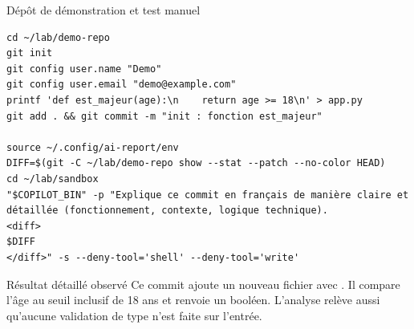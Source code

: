 \documentclass[aspectratio=169,10pt,t]{beamer}
\begin{document}
\begin{frame}[fragile]{D\'ep\^ot de d\'emonstration et test manuel}
\begin{lstlisting}[style=term]
cd ~/lab/demo-repo
git init
git config user.name "Demo"
git config user.email "demo@example.com"
printf 'def est_majeur(age):\n    return age >= 18\n' > app.py
git add . && git commit -m "init : fonction est_majeur"

source ~/.config/ai-report/env
DIFF=$(git -C ~/lab/demo-repo show --stat --patch --no-color HEAD)
cd ~/lab/sandbox
"$COPILOT_BIN" -p "Explique ce commit en français de manière claire et détaillée (fonctionnement, contexte, logique technique).
<diff>
$DIFF
</diff>" -s --deny-tool='shell' --deny-tool='write'
\end{lstlisting}
\begin{exampleblock}{R\'esultat d\'etaill\'e observ\'e}
\og Ce commit ajoute un nouveau fichier  avec . Il compare l'\^age au seuil inclusif de 18 ans et renvoie un bool\'een. L'analyse rel\`eve aussi qu'aucune validation de type n'est faite sur l'entr\'ee. \fg{}
\end{exampleblock}
\end{frame}

\end{document}
